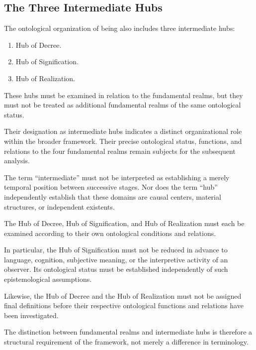 \subsection{The Three Intermediate Hubs}

The ontological organization of being also includes
three intermediate hubs:

\begin{enumerate}
    \item Hub of Decree.
    \item Hub of Signification.
    \item Hub of Realization.
\end{enumerate}

These hubs must be examined in relation to the
fundamental realms, but they must not be treated
as additional fundamental realms of the same
ontological status.

Their designation as intermediate hubs indicates
a distinct organizational role within the broader
framework. Their precise ontological status,
functions, and relations to the four fundamental
realms remain subjects for the subsequent analysis.

The term ``intermediate'' must not be interpreted
as establishing a merely temporal position between
successive stages. Nor does the term ``hub''
independently establish that these domains are
causal centers, material structures, or independent
existents.

The Hub of Decree, Hub of Signification, and Hub
of Realization must each be examined according to
their own ontological conditions and relations.

In particular, the Hub of Signification must not
be reduced in advance to language, cognition,
subjective meaning, or the interpretive activity
of an observer. Its ontological status must be
established independently of such epistemological
assumptions.

Likewise, the Hub of Decree and the Hub of
Realization must not be assigned final definitions
before their respective ontological functions and
relations have been investigated.

The distinction between fundamental realms and
intermediate hubs is therefore a structural
requirement of the framework, not merely a
difference in terminology.


